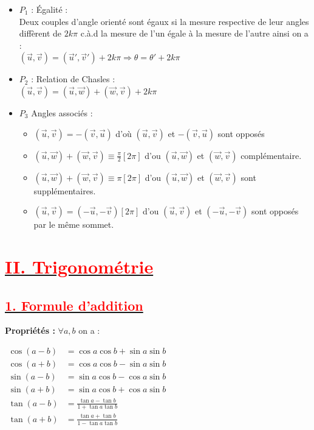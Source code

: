 \documentclass[12pt,a4paper]{article}
\begin{document}
\begin{itemize}
    \item $P_1$ : Égalité :\\
Deux couples d'angle orienté sont égaux si la mesure respective de leur angles diffèrent de $2k\pi$ c.à.d la mesure de l'un égale à la mesure de l'autre ainsi on a :\\
$(\vec{u}, \vec{v}) = (\vec{u}', \vec{v}') + 2k\pi \Rightarrow \theta = \theta' + 2k\pi$
\item $P_2$ : Relation de Chasles :\\
$(\vec{u}, \vec{v}) = (\vec{u}, \vec{w}) + (\vec{w}, \vec{v}) + 2k\pi$

    \item $P_3$ Angles associés :
    \begin{itemize}
    \item $(\vec{u}, \vec{v}) = -(\vec{v}, \vec{u})$ d'où $(\vec{u}, \vec{v})$ et $-(\vec{v}, \vec{u})$ sont opposés\\
    \item $(\vec{u}, \vec{w}) + (\vec{w}, \vec{v}) \equiv \frac{\pi}{2}[2\pi]$ d'ou $(\vec{u}, \vec{w})$ et $(\vec{w}, \vec{v})$ complémentaire.\\
    \item $(\vec{u}, \vec{w}) + (\vec{w}, \vec{v}) \equiv \pi[2\pi]$ d'ou $(\vec{u}, \vec{w})$ et $(\vec{w}, \vec{v})$ sont supplémentaires.\\
    \item $(\vec{u}, \vec{v}) = (-\vec{u}, -\vec{v})[2\pi]$ d'ou $(\vec{u}, \vec{v})$ et $(-\vec{u}, -\vec{v})$ sont opposés par le même sommet.
\end{itemize}
\end{itemize}

\section*{\underline{\textbf{\textcolor{red}{II. Trigonométrie }}}}    
\subsection*{\underline{\textbf{\textcolor{red}{1. Formule d’addition }}}}

\textbf{Propriétés :} $\forall a,b$ on a :

$
\begin{aligned}
\cos(a-b) &= \cos a \cos b + \sin a \sin b \\
\cos(a+b) &= \cos a \cos b - \sin a \sin b \\
\sin(a-b) &= \sin a \cos b - \cos a \sin b \\
\sin(a+b) &= \sin a \cos b + \cos a \sin b \\
\tan(a-b) &= \frac{\tan a - \tan b}{1 + \tan a \tan b} \\
\tan(a+b) &= \frac{\tan a + \tan b}{1 - \tan a \tan b}
\end{aligned}$
\end{document}

